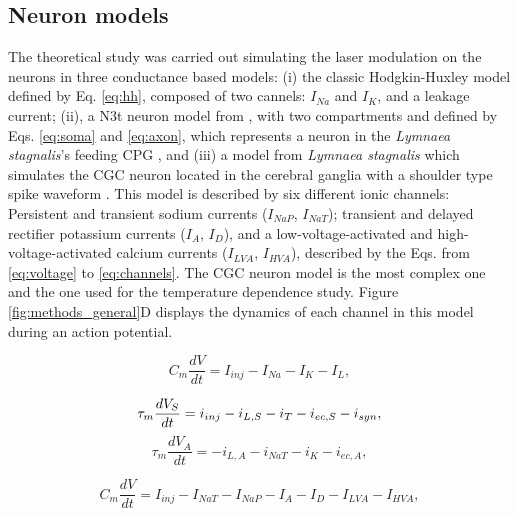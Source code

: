 \subsection{Neuron models}
\label{sec:model equations}
The theoretical study was carried out simulating the laser modulation on the neurons in three conductance based models: (i) the classic Hodgkin-Huxley model \cite{Hodgkin1952} defined by Eq. \ref{eq:hh}, composed of two cannels: $I_{Na}$ and $I_K$, and a leakage current; (ii), a N3t neuron model from \cite{Vavoulis2007}, with two compartments and defined by Eqs. \ref{eq:soma} and \ref{eq:axon}, which represents a neuron in the \textit{Lymnaea stagnalis}'s feeding CPG \cite{garrido-pena_characterization_2021}, and (iii) a model from \textit{Lymnaea stagnalis} which simulates the CGC neuron located in the cerebral ganglia with a shoulder type spike waveform \cite{Vavoulis2010}. This model is described by six different ionic channels: Persistent and transient sodium currents ($I_{NaP}$, $I_{NaT}$); transient and delayed rectifier potassium currents ($I_A$, $I_D$), and a low-voltage-activated and high-voltage-activated calcium currents ($I_{LVA}$, $I_{HVA}$), described by the Eqs. from \ref{eq:voltage} to \ref{eq:channels}. The CGC neuron model is the most complex one and the one used for the temperature dependence study.  Figure \ref{fig:methods_general}D displays the dynamics of each channel in this model during an action potential.


\begin{equation}
    C_m\frac{dV}{dt} = I_{inj} - I_{Na} - I_K - I_L,
    \label{eq:hh}
\end{equation}

\begin{equation}
    \tau_m\frac{dV_S}{dt} = i_{inj} - i_{L,S} - i_T - i_{ec,S} - i_{syn}\\,
    \label{eq:soma}
\end{equation}
\begin{equation}
    \tau_m\frac{dV_A}{dt} = -i_{L,A} - i_{NaT} - i_K - i_{ec,A},
    \label{eq:axon}
\end{equation}

\begin{equation}
    C_m\frac{dV}{dt} = I_{inj} - I_{NaT} - I_{NaP} - I_{A} - I_{D} - I_{LVA} - I_{HVA},
    \label{eq:voltage}
\end{equation}

